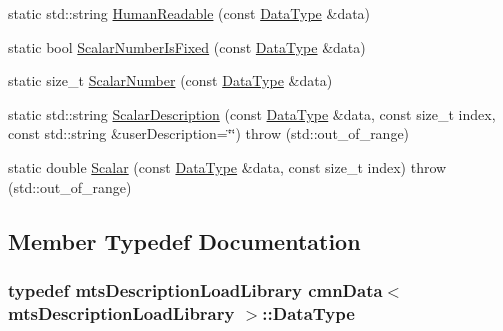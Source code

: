 \begin{DoxyCompactItemize}
\item 
static std\+::string \hyperlink{classcmn_data_3_01mts_description_load_library_01_4_a80990b8f6941211a43e77575227e6941}{Human\+Readable} (const \hyperlink{classcmn_data_3_01mts_description_load_library_01_4_a185937b284886b8335946dd8e0591d0a}{Data\+Type} \&data)
\item 
static bool \hyperlink{classcmn_data_3_01mts_description_load_library_01_4_adc6d14c1b50ef0d761e9578952c21391}{Scalar\+Number\+Is\+Fixed} (const \hyperlink{classcmn_data_3_01mts_description_load_library_01_4_a185937b284886b8335946dd8e0591d0a}{Data\+Type} \&data)
\item 
static size\+\_\+t \hyperlink{classcmn_data_3_01mts_description_load_library_01_4_a66e08a1cb5669a2c3cad6bb5af134d68}{Scalar\+Number} (const \hyperlink{classcmn_data_3_01mts_description_load_library_01_4_a185937b284886b8335946dd8e0591d0a}{Data\+Type} \&data)
\item 
static std\+::string \hyperlink{classcmn_data_3_01mts_description_load_library_01_4_a98729d32c0275fbae80c19235d22c95a}{Scalar\+Description} (const \hyperlink{classcmn_data_3_01mts_description_load_library_01_4_a185937b284886b8335946dd8e0591d0a}{Data\+Type} \&data, const size\+\_\+t index, const std\+::string \&user\+Description=\char`\"{}\char`\"{})  throw (std\+::out\+\_\+of\+\_\+range)
\item 
static double \hyperlink{classcmn_data_3_01mts_description_load_library_01_4_a87b0a9c77a386662d326d1445814431b}{Scalar} (const \hyperlink{classcmn_data_3_01mts_description_load_library_01_4_a185937b284886b8335946dd8e0591d0a}{Data\+Type} \&data, const size\+\_\+t index)  throw (std\+::out\+\_\+of\+\_\+range)
\end{DoxyCompactItemize}


\subsection{Member Typedef Documentation}
\hypertarget{classcmn_data_3_01mts_description_load_library_01_4_a185937b284886b8335946dd8e0591d0a}{}
\subsubsection[{Data\+Type}]{\setlength{\rightskip}{0pt plus 5cm}typedef {\bf mts\+Description\+Load\+Library} {\bf cmn\+Data}$<$ {\bf mts\+Description\+Load\+Library} $>$\+::{\bf Data\+Type}}\label{classcmn_data_3_01mts_description_load_library_01_4_a185937b284886b8335946dd8e0591d0a}


